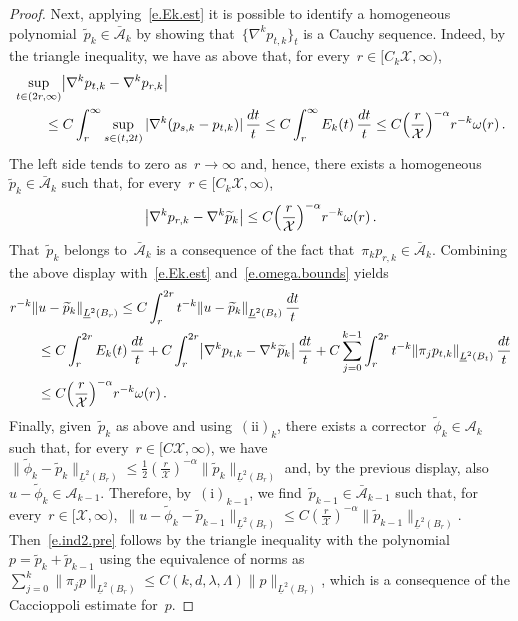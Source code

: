 \documentclass[11pt,twoside]{article} %
\numberwithin{equation}{section}
\theoremstyle{definition}
\let\originalleft\left
\let\originalright\right
\renewcommand{\left}{\mathopen{}\mathclose\bgroup\originalleft}
\renewcommand{\right}{\aftergroup\egroup\originalright}
\renewcommand*{\tilde}{\widetilde}
\newcommand{\X}{\mathcal{X}}
\newcommand{\A}{\mathcal{A}}
\newcommand{\Ahom}{\bar{\A}}
\begin{document}
\begin{proof}
Next, applying~\eqref{e.Ek.est} it is possible to identify a homogeneous polynomial~$\tilde p_{k} \in \Ahom_k$ by showing that~$\{ \nabla^k p_{t,k}\}_t$ is a Cauchy sequence. Indeed, by the triangle inequality, we have as above that, for every~$r\in [C_k \X,\infty)$, 
\begin{align*} %
\lefteqn{\sup_{t \in (2r,\infty)}
\bigl| \nabla^{k} p_{t,k} - \nabla^{k}  p_{r,k} \bigr|
} \qquad &
\notag \\  & 
\leq 
C \int_{r}^\infty \sup_{s \in (t,2t)} |\nabla^{k} (p_{s,k} - p_{t,k}) | \, \frac{dt}{t}    
\leq 
C \int_{r}^\infty E_{k}(t) \, \frac{dt}{t}
\leq
C \Bigl( \frac{r}{\X} \Bigr)^{-\alpha} r^{-k} \omega(r) \,.
\end{align*}
The left side tends to zero as~$r\to \infty$ and, hence, there exists a homogeneous~$\tilde p_k \in \Ahom_k$ such that, for every~$r\in [C_k \X,\infty)$, 
\begin{equation*} %
\bigl| \nabla^{k} p_{r,k} - \nabla^{k}  \tilde p_{k} \bigr| 
\leq 
C \Bigl( \frac{r}{\X} \Bigr)^{-\alpha} r^{-k} \omega(r) \,.
\end{equation*}
That~$\tilde p_k$ belongs to~$\Ahom_k$ is a consequence of the fact that~$\pi_k p_{r,k} \in \Ahom_k$. 
Combining the above display with~\eqref{e.Ek.est} and~\eqref{e.omega.bounds} yields 
\begin{align*} %
\lefteqn{
r^{-k} \left\| u - \tilde p_{k} \right\|_{\underline{L}^2(B_r)}  
\leq
C
\int_{r}^{2r} t^{-k} \left\| u - \tilde p_{k} \right\|_{\underline{L}^2(B_t)}\, \frac{dt}{t} 
} \qquad &
\notag\\ &
\leq
C 
\int_{r}^{2r} E_k(t) \, \frac{dt}{t} 
+
C \int_{r}^{2r} \bigl | \nabla^k p_{t,k} - \nabla^k \tilde p_{k} \bigr| \, \frac{dt}{t} 
+ 
C \sum_{j=0}^{k-1} \int_{r}^{2r}  t^{-k} \left\| \pi_j p_{t,k} \right\|_{\underline{L}^2(B_t)} \, \frac{dt}{t} 
\notag\\ &
\leq
C \Bigl( \frac{r}{\X} \Bigr)^{-\alpha} r^{-k} \omega(r) \,.
\end{align*}
Finally, given~$\tilde p_k$ as above and using~$\mathrm{(ii)}_{k}$, there exists a corrector~$\tilde \phi_k \in \A_k$ such that, for every~$r \in [C \X,\infty)$, we have~$\| \tilde \phi_k -\tilde p_{k} \|_{\underline{L}^2(B_r)} \leq \frac12 ( \frac{r}{\X} )^{-\alpha}  \| \tilde p_{k} \|_{\underline{L}^2(B_r)}$ and, by the previous display, also~$u - \tilde \phi_k \in \A_{k-1}$. Therefore, by~$\mathrm{(i)}_{k-1}$, we find~$\tilde p_{k-1} \in \Ahom_{k-1}$ such that, for every~$r \in [\X,\infty)$,~$\| u - \tilde \phi_k -\tilde p_{k-1} \|_{\underline{L}^2(B_r)} \leq C ( \frac{r}{\X} )^{-\alpha} \| \tilde p_{k-1} \|_{\underline{L}^2(B_r)}$. Then~\eqref{e.ind2.pre} follows by the triangle inequality with the polynomial~$p = \tilde p_k + \tilde p_{k-1}$ using the equivalence of norms as~$\sum_{j=0}^k \| \pi_j p \|_{\underline{L}^2(B_r)} \leq C(k,d,\lambda,\Lambda) \| p \|_{\underline{L}^2(B_r)}$, which is a consequence of the Caccioppoli estimate for~$p$. 


\end{proof}
\end{document}
